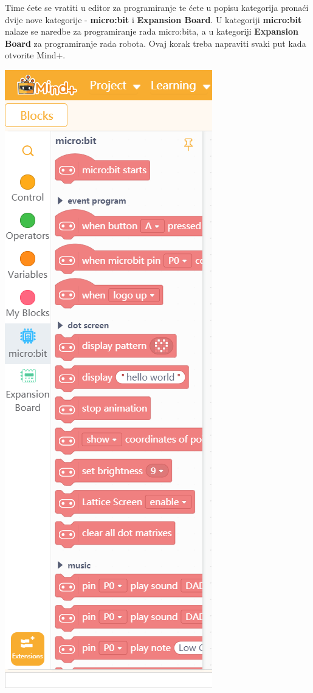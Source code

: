 \vspace{3mm}

Time ćete se vratiti u editor za programiranje te ćete u popisu kategorija pronaći dvije nove kategorije - \textbf{micro:bit} i \textbf{Expansion Board}. U kategoriji \textbf{micro:bit} nalaze se naredbe za programiranje rada micro:bita, a u kategoriji \textbf{Expansion Board} za programiranje rada robota. Ovaj korak treba napraviti svaki put kada otvorite Mind+.


\vspace{3mm}

\hspace*{10mm}
\includegraphics[scale=0.55]{Mindplus10.png}

